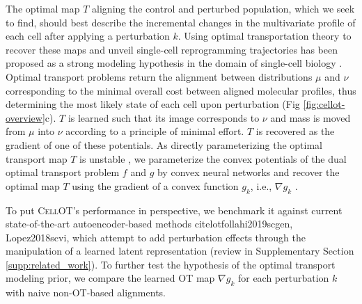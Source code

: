 The optimal map $T$ aligning the control and perturbed population, which we seek to find, should best describe the incremental changes in the multivariate profile of each cell after applying a perturbation $k$.
Using optimal transportation theory \cite{villani2021topics, santambrogio2015optimal} to recover these maps and unveil single-cell reprogramming trajectories has been proposed as a strong modeling hypothesis in the domain of single-cell biology \cite{schiebinger2019optimal, cang2020inferring, demetci2020gromov, huizing2021optimal, lavenant2021towards, zhang2021optimal}.
Optimal transport problems return the alignment between distributions $\mu$ and $\nu$ corresponding to the minimal overall cost between aligned molecular profiles, thus determining the most likely state of each cell upon perturbation (Fig \ref{fig:cellot-overview}c).
$T$ is learned such that its image corresponds to $\nu$ and mass is moved from $\mu$ into $\nu$ according to a principle of minimal effort.
$T$ is recovered as the gradient of one of these potentials.
As directly parameterizing the optimal transport map $T$ \cite{korotin2019wasserstein, yang2018scalable, prasad2020optimal} is unstable \citep[Table 1]{makkuva2020optimal}, we parameterize the convex potentials of the dual optimal transport problem $f$ and $g$ by convex neural networks \cite{amos2017input} and recover the optimal map $T$ using the gradient of a convex function $g_k$, i.e., $\nabla g_k$ \cite{makkuva2020optimal}.

To put \textsc{CellOT}'s performance in perspective, we benchmark it against current state-of-the-art autoencoder-based methods cite{lotfollahi2019scgen, Lopez2018scvi},
which attempt to add perturbation effects through the manipulation of a learned latent representation (review in Supplementary Section \ref{supp:related_work}).
To further test the hypothesis of the optimal transport modeling prior, we compare the learned OT map $\nabla g_k$ for each perturbation $k$ with naive non-OT-based alignments.


